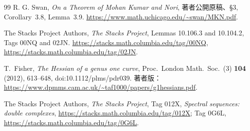\documentclass[a4paper,11pt]{ltjsarticle}
\theoremstyle{definition}
\begin{document}
\begin{thebibliography}{99}
R. G. Swan,
\emph{On a Theorem of Mohan Kumar and Nori},
著者公開原稿、\S3, Corollary~3.8, Lemma~3.9.
\url{https://www.math.uchicago.edu/~swan/MKN.pdf}.

The Stacks Project Authors,
\emph{The Stacks Project},
Lemmas 10.106.3 and 10.104.2, Tags 00NQ and 02JN.
\url{https://stacks.math.columbia.edu/tag/00NQ},
\url{https://stacks.math.columbia.edu/tag/02JN}.


T.~Fisher,
\emph{The Hessian of a genus one curve},
Proc.\ London Math.\ Soc.\ (3) \textbf{104} (2012), 613--648,
doi:10.1112/plms/pdr039.
著者版：\url{https://www.dpmms.cam.ac.uk/~taf1000/papers/g1hessians.pdf}.

The Stacks Project Authors,
\emph{The Stacks Project},
Tag 012X, \emph{Spectral sequences: double complexes},
\url{https://stacks.math.columbia.edu/tag/012X};
Tag 0G6L,
\url{https://stacks.math.columbia.edu/tag/0G6L}.

\end{thebibliography}
\end{document}
